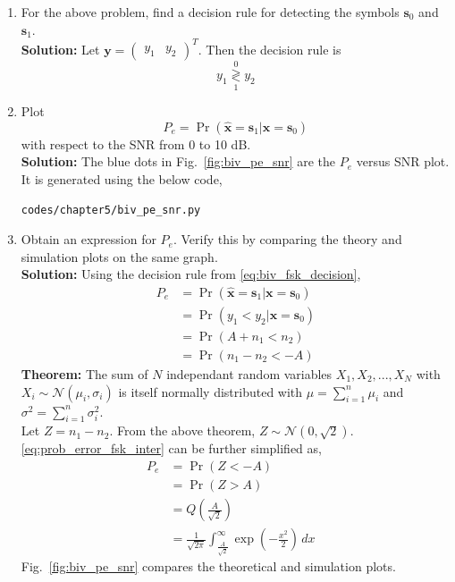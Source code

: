 \documentclass[journal,10pt,twocolumn]{IEEEtran}
\newcommand\figref{Fig.~\ref}
\providecommand{\mbf}{\mathbf}
\providecommand{\pr}[1]{\ensuremath{\Pr\left(#1\right)}}
\providecommand{\qfunc}[1]{\ensuremath{Q\left(#1\right)}}
\newcommand{\solution}{\noindent \textbf{Solution: }}
\providecommand{\dec}[2]{\ensuremath{\overset{#1}{\underset{#2}{\gtrless}}}}
\newcommand{\myvec}[1]{\ensuremath{\begin{pmatrix}#1\end{pmatrix}}}
\providecommand{\gauss}[2]{\mathcal{N}\ensuremath{\left(#1,#2\right)}}
\begin{document}
\begin{enumerate}
%
\item
For the above problem, find a decision rule for detecting the symbols $\mbf{s}_0 $ and $\mbf{s}_1$.\\
\solution Let $\mbf{y} = \myvec{y_1&y_2}^T$. Then the decision rule is
\begin{equation}
	y_1 \dec{0}{1} y_2
	\label{eq:biv_fsk_decision}
\end{equation}
%
\item
Plot 
\begin{equation} 
P_e = \pr{\hat{\mbf{x}} = \mbf{s}_1|\mbf{x} = \mbf{s}_0}
\label{eq:prob_error_fsk}
\end{equation}
with respect to the SNR from 0 to 10 dB.\\
\solution The blue dots in \figref{fig:biv_pe_snr} are the $P_e$ versus SNR plot. It is generated using the below code,
\begin{lstlisting}
codes/chapter5/biv_pe_snr.py
\end{lstlisting}
%
\item
Obtain an expression for $P_e$. Verify this by comparing the theory and simulation plots on the same graph.\\
\solution Using the decision rule from \eqref{eq:biv_fsk_decision},
\begin{align}
	\nonumber
	P_e &= \pr{\hat{\mbf{x}} = \mbf{s}_1|\mbf{x} = \mbf{s}_0}\\\nonumber
	&= \pr{y_1 < y_2|\mbf{x} = \mbf{s}_0}\\\nonumber
	&= \pr{A+n_1 < n_2}\\
	\label{eq:prob_error_fsk_inter}
	&= \pr{n_1-n_2 < -A}
\end{align}
\textbf{Theorem:} The sum of $N$ independant random variables $X_1,X_2,...,X_N$ with $X_i \sim \gauss{\mu_i}{\sigma_i}$ is itself normally distributed %
with $\mu =\sum_{i=1}^n \mu_i$ and $\sigma^2 = \sum_{i=1}^n \sigma_i^2$.\\
Let $Z=n_1-n_2$. From the above theorem, $Z \sim \gauss{0}{\sqrt{2}}$. \eqref{eq:prob_error_fsk_inter} can be further simplified as,
\begin{align*}
	P_e &= \pr{Z < -A}&\\
	&= \pr{Z > A}&\\
	&= \qfunc{\frac{A}{\sqrt{2}}}&\\
	&= \frac{1}{\sqrt{2\pi}}\int_{\frac{A}{\sqrt{2}}}^{\infty} \exp\left(-\frac{x^2}{2}\right)  \,dx 
\end{align*}
\figref{fig:biv_pe_snr} compares the theoretical and simulation plots.


\end{enumerate}
\end{document}
